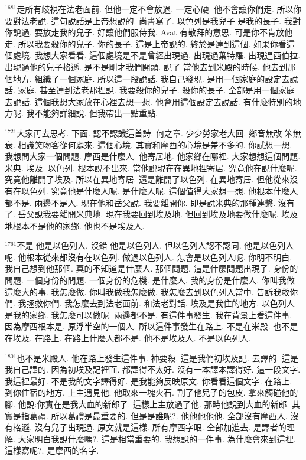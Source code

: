 \documentclass{book}
\begin{document}
$^{1681}$走所有歧視在法老面前.
但他一定不會放過.
一定心硬.
他不會讓你們走.
所以你要對法老說.
這句說話是上帝想說的.
尚書寫了.
以色列是我兒子 是我的長子.
我對你說過.
要放走我的兒子.
好讓他們服侍我.
Avat 有敬拜的意思.
可是你不肯放他走.
所以我要殺你的兒子.
你的長子.
這是上帝說的.
終於是達到這個.
如果你看這個處境.
我想大家看看.
這個處境是不是曾經出現過.
出現過葉特羅.
出現過西伯拉.
出現過他的兒子格遜.
是不是剛才我們開頭.
說了 當他去到米殿的時候.
他去到那個地方.
組織了一個家庭.
所以這一段說話.
我自己發現.
是用一個家庭的設定去說話.
家庭.
甚至連到法老那裡說.
我要殺你的兒子.
殺你的長子.
全部是用一個家庭去說話.
這個我想大家放在心裡去想一想.
他會用這個設定去說話.
有什麼特別的地方呢.
我不能夠詳細說.
但我帶出一點重點.

$^{1721}$大家再去思考.
下面.
認不認識這首詩.
何之章.
少少勞家老大回.
鄉音無改 笨無衰.
相識笑吻客從何處來.
這個心境.
其實和摩西的心境是差不多的.
你試想一想.
我想問大家一個問題.
摩西是什麼人.
他寄居地.
他家鄉在哪裡.
大家想想這個問題.
米典.
埃及.
以色列.
根本說不出來.
當他說現在在異地裡寄居.
究竟他在說什麼呢.
究竟他離開了埃及.
所以在異地寄居.
還是離開了以色列.
在異地寄居.
但他從來沒有在以色列.
究竟他是什麼人呢.
是什麼人呢.
這個值得大家想一想.
他根本什麼人都不是.
兩邊不是人.
現在他和岳父說.
我要離開你.
即是說米典的那種連繫.
沒有了.
岳父說我要離開米典地.
現在我要回到埃及地.
但回到埃及地要做什麼呢.
埃及地根本不是他的家鄉.
他也不是埃及人.

$^{1761}$不是 他是以色列人.
沒錯 他是以色列人.
但以色列人認不認同.
他是以色列人呢.
他根本從來都沒有在以色列.
做過以色列人.
怎會是以色列人呢.
你明不明白.
我自己想到他那個.
真的不知道是什麼人.
那個問題.
這是什麼問題出現了.
身份的問題.
一個身份的問題.
一個身份的危機.
是什麼人.
我的身份是什麼人.
你叫我做這麼大的事.
我怎麼做.
你叫我做我怎麼做.
我怎麼去到以色列人當中.
告訴我救你們.
我拯救你們.
我怎麼去到法老面前.
和法老對話.
埃及是我住的地方.
以色列人是我的家鄉.
我怎麼可以做呢.
兩邊都不是.
有這件事發生.
我在背景上看這件事.
因為摩西根本是.
原浮半空的一個人.
所以這件事發生在路上.
不是在米殿.
也不是在埃及.
在路上.
在路上什麼人都不是.
他不是埃及人.
不是以色列人.

$^{1801}$也不是米殿人.
他在路上發生這件事.
神要殺.
這是我們初埃及記.
去譯的.
這是我自己譯的.
因為初埃及記裡面.
都譯得不太好.
沒有一本譯本譯得好.
這一段文字.
我這裡最好.
不是我的文字譯得好.
是我能夠反映原文.
你看看這個文字.
在路上.
到你住宿的地方.
上主遇見他.
他取來一塊火石.
割了他兒子的包皮.
拿來觸碰他的腳.
他說:你實在是我大血的新郎了.
這樣上主放過了他.
那時他說到大血的新郎.
其實是指葛禮.
所以葛禮是最重要的.
但是是誰呢?.
他他他他他.
全部沒有摩西人.
沒有格遜.
沒有兒子出現過.
原文就是這樣.
所有摩西字眼.
全部加進去.
是譯者的理解.
大家明白我說什麼嗎?.
這是相當重要的.
我想說的一件事.
為什麼會來到這裡.
這樣寫呢?.
是摩西的名字.
\end{document}
